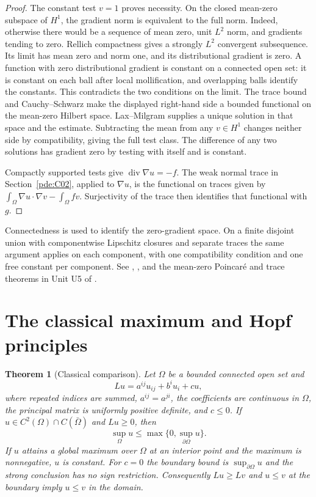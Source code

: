 \documentclass[11pt,oneside,openany]{book}
\theoremstyle{plain}
\newtheorem{theorem}{Theorem}[chapter]
\theoremstyle{definition}
\theoremstyle{remark}
\begin{document}
\begin{proof}
The constant test \(v=1\) proves necessity. On the closed mean-zero
subspace of \(H^1\), the gradient norm is equivalent to the full
norm. Indeed, otherwise there would be a sequence of mean zero,
unit \(L^2\) norm, and gradients tending to zero. Rellich compactness
gives a strongly \(L^2\) convergent subsequence. Its limit has mean
zero and norm one, and its distributional gradient is zero.
A function with zero distributional gradient is constant on a
connected open set: it is constant on each ball after local
mollification, and overlapping balls identify the constants.
This contradicts the two conditions on the limit.
The trace bound and Cauchy--Schwarz make the displayed right-hand
side a bounded functional on the mean-zero Hilbert space.
Lax--Milgram supplies a unique solution in that space and the
estimate. Subtracting the mean from any \(v\in H^1\) changes
neither side by compatibility, giving the full test class. The
difference of any two solutions has gradient zero by testing with
itself and is constant.

Compactly supported tests give \(\operatorname{div}\nabla u=-f\).
The weak normal trace in Section~\ref{pde:C02}, applied to
\(\nabla u\), is the functional on traces given by
\(\int_\Omega\nabla u\cdot\nabla v-\int_\Omega fv\).
Surjectivity of the trace then identifies that functional with \(g\).
\end{proof}

Connectedness is used to identify the zero-gradient space.
On a finite disjoint union with componentwise Lipschitz closures
and separate traces the same argument applies on each component,
with one compatibility condition and one free constant per
component. See \cite[Section 9.4.1]{RR},
\cite[Chapter 5, Section 7]{TaylorI}, and the mean-zero Poincaré
and trace theorems in Unit U5 of \cite{P102}.

\section{The classical maximum and Hopf principles}\label{pde:E03}

\begin{theorem}[Classical comparison]\label{pde:elliptic-max}
Let \(\Omega\) be a bounded connected open set and
\[
 Lu=a^{ij}u_{ij}+b^iu_i+cu ,
\]
where repeated indices are summed, \(a^{ij}=a^{ji}\), the
coefficients are continuous in \(\Omega\), the principal matrix
is uniformly positive definite, and \(c\leq0\).
If \(u\in C^2(\Omega)\cap C(\bar\Omega)\) and \(Lu\geq0\), then
\[
 \sup_\Omega u\leq\max\{0,\sup_{\partial\Omega}u\}.
\]
If \(u\) attains a global maximum over \(\Omega\) at an interior
point and the maximum is nonnegative, \(u\) is constant.
For \(c=0\) the boundary bound is \(\sup_{\partial\Omega}u\)
and the strong conclusion has no sign restriction.
Consequently \(Lu\geq Lv\) and \(u\leq v\) at the boundary
imply \(u\leq v\) in the domain.
\end{theorem}
\end{document}
